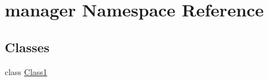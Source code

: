 \hypertarget{namespacemanager}{}\section{manager Namespace Reference}
\label{namespacemanager}
\subsection*{Classes}
\begin{DoxyCompactItemize}
\item 
class \hyperlink{classmanager_1_1_class1}{Class1}
\end{DoxyCompactItemize}
